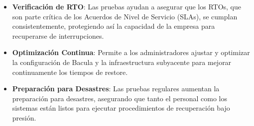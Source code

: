 \begin{itemize}
    \item \textbf{Verificación de RTO}: Las pruebas ayudan a asegurar que los RTOs, que son parte crítica de los Acuerdos de Nivel de Servicio (SLAs), se cumplan consistentemente, protegiendo así la capacidad de la empresa para recuperarse de interrupciones.
    \item \textbf{Optimización Continua}: Permite a los administradores ajustar y optimizar la configuración de Bacula y la infraestructura subyacente para mejorar continuamente los tiempos de restore.
    \item \textbf{Preparación para Desastres}: Las pruebas regulares aumentan la preparación para desastres, asegurando que tanto el personal como los sistemas están listos para ejecutar procedimientos de recuperación bajo presión.
\end{itemize}


